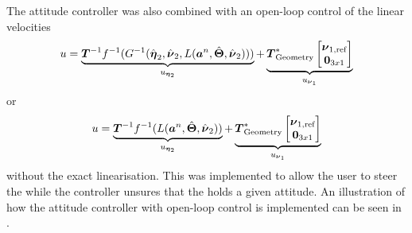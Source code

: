 The attitude controller was also combined with an open-loop control of the linear velocities
\begin{equation}
	u = \underbrace{\boldsymbol{T}^{-1}f^{-1}(G^{-1}(\hat{\etaVector}_2,\hat{\nuVector}_2,L(\accVector^n,\hat{\eulerAngles},\hat{\nuVector}_2)))}_{u_{\etaVectorAng}} + \underbrace{\thrusterGeometryOnes[*] \begin{bmatrix} \nuVector_{1,\text{ref}} \\ \zeroCol{3} \end{bmatrix}}_{u_{\nuVectorLin}}
\end{equation}
or
\begin{equation}
	u = \underbrace{\boldsymbol{T}^{-1}f^{-1}(L(\accVector^n,\hat{\eulerAngles},\hat{\nuVector}_2))}_{u_{\etaVectorAng}} + \underbrace{\thrusterGeometryOnes[*] \begin{bmatrix} \nuVector_{1,\text{ref}} \\ \zeroCol{3} \end{bmatrix}}_{u_{\nuVectorLin}}
\end{equation}
without the exact linearisation. This was implemented to allow the user to steer the \abbrROV while the controller unsures that the \abbrROV holds a given attitude. An illustration of how the attitude controller with open-loop control is implemented can be seen in .

